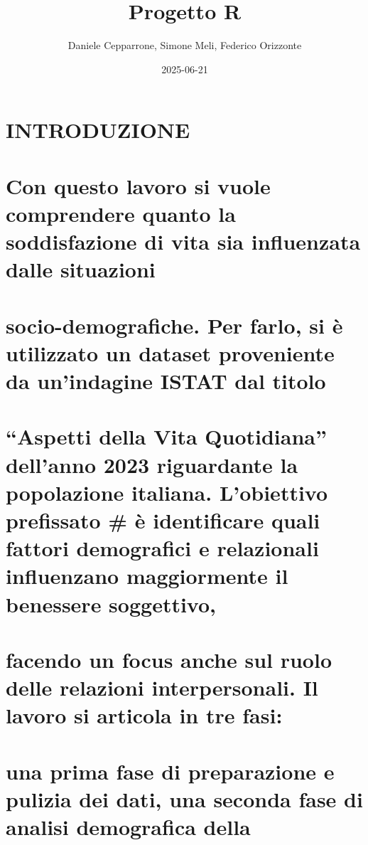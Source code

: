 \documentclass[
]{article}
\title{Progetto R}
\author{Daniele Cepparrone, Simone Meli, Federico Orizzonte}
\date{2025-06-21}
\begin{document}
\maketitle

\section{INTRODUZIONE}\label{introduzione}

\section{Con questo lavoro si vuole comprendere quanto la soddisfazione
di vita sia influenzata dalle
situazioni}\label{con-questo-lavoro-si-vuole-comprendere-quanto-la-soddisfazione-di-vita-sia-influenzata-dalle-situazioni}

\section{socio-demografiche. Per farlo, si è utilizzato un dataset
proveniente da un'indagine ISTAT dal
titolo}\label{socio-demografiche.-per-farlo-si-uxe8-utilizzato-un-dataset-proveniente-da-unindagine-istat-dal-titolo}

\section{``Aspetti della Vita Quotidiana'' dell'anno 2023 riguardante la
popolazione italiana. L'obiettivo prefissato \# è identificare quali
fattori demografici e relazionali influenzano maggiormente il benessere
soggettivo,}\label{aspetti-della-vita-quotidiana-dellanno-2023-riguardante-la-popolazione-italiana.-lobiettivo-prefissato-uxe8-identificare-quali-fattori-demografici-e-relazionali-influenzano-maggiormente-il-benessere-soggettivo}

\section{facendo un focus anche sul ruolo delle relazioni
interpersonali. Il lavoro si articola in tre
fasi:}\label{facendo-un-focus-anche-sul-ruolo-delle-relazioni-interpersonali.-il-lavoro-si-articola-in-tre-fasi}

\section{una prima fase di preparazione e pulizia dei dati, una seconda
fase di analisi demografica
della}\label{una-prima-fase-di-preparazione-e-pulizia-dei-dati-una-seconda-fase-di-analisi-demografica-della}
\end{document}
